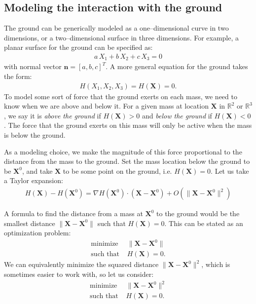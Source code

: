 \documentclass[10pt]{article}
\newcommand{\bs}[1]{{\boldsymbol #1}}
\begin{document}
\subsection{Modeling the interaction with the ground}

The ground can be generically modeled as a one--dimensional curve in two dimensions, or a two--dimensional surface in three dimensions.  For example, a planar surface for the ground can be specified as:
\begin{align*}
a \, X_1 + b\, X_2 + c \,X_3 = 0
\end{align*}
with normal vector ${\bs n} = [a,b,c]^T$.  A more general equation for the ground takes the form:
\begin{align*}
H(X_1,X_2,X_3) = H({\bs X}) = 0.
\end{align*}
To model some sort of force that the ground exerts on each mass, we need to know when we are above and below it.  For a given mass at location ${\bs X}$ in $\mathbb{R}^2$ or $\mathbb{R}^3$, we say it is {\em above the ground} if $H({\bs X}) > 0$ and {\em below the ground} if $H({\bs X}) < 0$.  The force that the ground exerts on this mass will only be active when the mass is below the ground.

As a modeling choice, we make the magnitude of this force proportional to the distance from the mass to the ground.  Set the mass location below the ground to be ${\bs X}^0$, and take ${\bs X}$ to be some point on the ground, i.e. $H({\bs X}) = 0$.  Let us take a Taylor expansion:
\begin{align}
\label{eq:te1}
H({\bs X}) - H({\bs X}^0) = \nabla H({\bs X}^0) \cdot ({\bs X} - {\bs X}^0) + O(\|{\bs X} - {\bs X}^0\|^2) 
\end{align}  

A formula to find the distance from a mass at ${\bs X}^0$ to the ground would be the smallest distance $\|{\bs X} - {\bs X}^0\|$ such that $H({\bs X}) = 0$.  This can be stated as an optimization problem:
\begin{align*}
\text{minimize } &\|{\bs X} - {\bs X}^0\| \\
\text{such that } &H({\bs X}) = 0.
\end{align*}
We can equivalently minimize the squared distance $\|{\bs X} - {\bs X}^0\|^2$, which is sometimes easier to work with, so let us consider:
\begin{align*}
\text{minimize } &\|{\bs X} - {\bs X}^0\|^2 \\
\text{such that } &H({\bs X}) = 0.
\end{align*}
\end{document}
